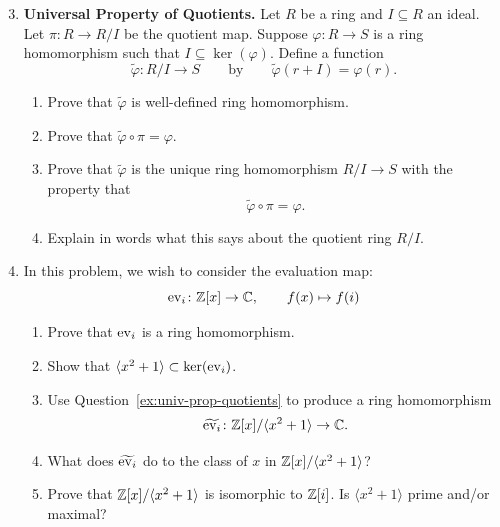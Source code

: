 \documentclass[12pt,reqno]{amsart}
\begin{document}
\begin{enumerate}[leftmargin=*]
  \setcounter{enumi}{2}
\item\label{ex:univ-prop-quotients} \textbf{Universal Property of Quotients.} Let $R$ be a ring and $I \subseteq R$ an ideal. Let $\pi\colon R \to R/I$ be the quotient map. Suppose $\varphi \colon R \to S$ is a ring homomorphism such that $I \subseteq \ker(\varphi)$. Define a function
    \[
    \widetilde{\varphi} \colon R/I \to S
    \qquad \text{by} \qquad
    \widetilde{\varphi}(r+I)=\varphi(r).
    \]
    \begin{enumerate}[label=(\alph*),ref=\theenumi\alph*]
    	\item Prove that $\widetilde{\varphi}$ is well-defined ring homomorphism.

    	\item Prove that $\widetilde{\varphi} \circ \pi = \varphi$.

    	\item Prove that $\widetilde{\varphi}$ is the unique ring homomorphism $R/I \to S$ with the property that
    	\[
  	  \widetilde{\varphi}\circ \pi = \varphi.
    	\]
    	\item Explain in words what this says about the quotient ring $R/I$.
    \end{enumerate}

\item In this problem, we wish to consider the evaluation map: 
    \[
    \operatorname{ev}_i \colon \mathbb{Z}[x] \to \mathbb{C},
    \qquad
    f(x)\mapsto f(i)
    \]
    \begin{enumerate}[label=(\alph*),ref=\theenumi\alph*]
    \item Prove that $\operatorname{ev}_{i}$ is a ring homomorphism.

    \item Show that $\langle x^2+1 \rangle \subset \ker(\operatorname{ev}_i)$.

    \item Use Question~\ref{ex:univ-prop-quotients} to produce a ring homomorphism
    \[
    \widetilde{\operatorname{ev}_i}\colon \mathbb{Z}[x]/\langle x^2+1 \rangle \to \mathbb{C}.
    \]

    \item What does $\widetilde{\operatorname{ev}_i}$ do to the class of $x$ in $\mathbb{Z}[x]/\langle x^2+1\rangle$?
    
    \item Prove that $\mathbb{Z}[x]/\langle x^2+1\rangle$ is isomorphic to $\mathbb{Z}[i]$. Is $\langle x^2 +1\rangle$ prime and/or maximal?
\end{enumerate}


\end{enumerate}
\end{document}
